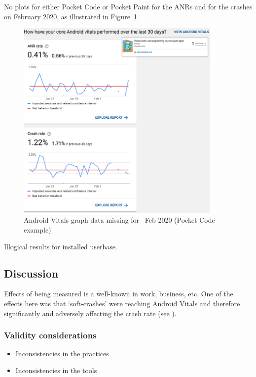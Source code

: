 No plots for either Pocket Code or Pocket Paint for the ANRs and for the crashes on  February 2020, as illustrated in Figure~\ref{fig:android-vitals-pocketcode-broken-graph-10-feb-2020}. 

\begin{figure}
    \centering
    \includegraphics[width=10cm]{images/google-play-console/android-vitals-pocketcode-broken-graph-10-feb-2020.png}
    \caption{Android Vitals graph data missing for~ Feb 2020 (Pocket Code example)}
    \label{fig:android-vitals-pocketcode-broken-graph-10-feb-2020}
\end{figure}
Illogical results for installed userbase. %

\subsection{Discussion}
Effects of being measured is a well-known in work, business, etc. One of the effects here was that `soft-crashes' were reaching Android Vitals and therefore significantly and adversely affecting the crash rate (see \cite{CATDROID-426-JIRA}).

\subsubsection{Validity considerations}
\begin{itemize}
    \item Inconsistencies in the practices
    \item Inconsistencies in the tools
\end{itemize}

